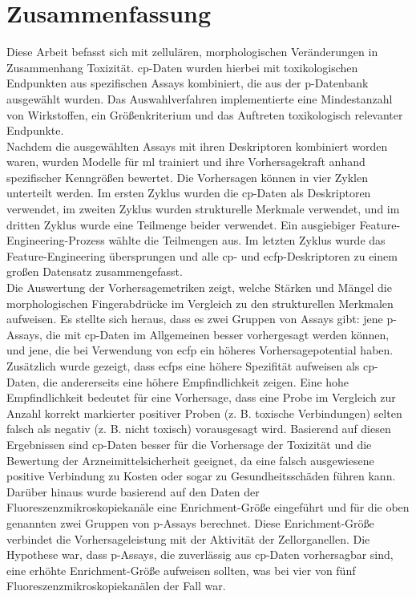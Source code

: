\section{Zusammenfassung}
Diese Arbeit befasst sich mit zellul\"aren, morphologischen Veränderungen in Zusammenhang Toxizität. \ac{cp}-Daten wurden hierbei mit toxikologischen Endpunkten aus spezifischen Assays kombiniert, die aus der \acl{p}-Datenbank ausgewählt wurden. Das Auswahlverfahren implementierte eine Mindestanzahl von Wirkstoffen, ein Größenkriterium und das Auftreten toxikologisch relevanter Endpunkte.\cite{Mervin2016}\\
Nachdem die ausgewählten Assays mit ihren Deskriptoren kombiniert worden waren, wurden Modelle für \ac{ml} trainiert und ihre Vorhersagekraft anhand spezifischer Kenngr\"o{\ss}en bewertet. Die Vorhersagen können in vier Zyklen unterteilt werden. Im ersten Zyklus wurden die \ac{cp}-Daten als Deskriptoren verwendet, im zweiten Zyklus wurden strukturelle Merkmale verwendet, und im dritten Zyklus wurde eine Teilmenge beider verwendet. Ein ausgiebiger Feature-Engineering-Prozess wählte die Teilmengen aus. Im letzten Zyklus wurde das Feature-Engineering übersprungen und alle \ac{cp}- und \ac{ecfp}-Deskriptoren zu einem großen Datensatz zusammengefasst.\\
Die Auswertung der Vorhersagemetriken zeigt, welche Stärken und Mängel die morphologischen Fingerabdrücke im Vergleich zu den strukturellen Merkmalen aufweisen. Es stellte sich heraus, dass es zwei Gruppen von Assays gibt: jene \acl{p}-Assays, die mit \ac{cp}-Daten im Allgemeinen besser vorhergesagt werden können, und jene, die bei Verwendung von \ac{ecfp} ein höheres Vorhersagepotential haben. Zusätzlich wurde gezeigt, dass \acp{ecfp} eine höhere Spezifität aufweisen als \ac{cp}-Daten, die andererseits eine höhere Empfindlichkeit zeigen. Eine hohe Empfindlichkeit bedeutet f\"ur eine Vorhersage, dass eine Probe im Vergleich zur Anzahl korrekt markierter positiver Proben (z. B. toxische Verbindungen) selten falsch als negativ (z. B. nicht toxisch) vorausgesagt wird. Basierend auf diesen Ergebnissen sind \ac{cp}-Daten besser für die Vorhersage der Toxizität und die Bewertung der Arzneimittelsicherheit geeignet, da eine falsch ausgewiesene positive Verbindung zu Kosten oder sogar zu Gesundheitsschäden führen kann. \\
Darüber hinaus wurde basierend auf den Daten der Fluoreszenzmikroskopiekanäle eine Enrichment-Gr\"o{\ss}e eingeführt und für die oben genannten zwei Gruppen von \acl{p}-Assays berechnet. Diese Enrichment-Gr\"o{\ss}e verbindet die Vorhersageleistung mit der Aktivität der Zellorganellen. Die Hypothese war, dass \acl{p}-Assays, die zuverlässig aus \ac{cp}-Daten vorhersagbar sind, eine erhöhte Enrichment-Gr\"o{\ss}e aufweisen sollten, was bei vier von fünf Fluoreszenzmikroskopiekanälen der Fall war.\\
